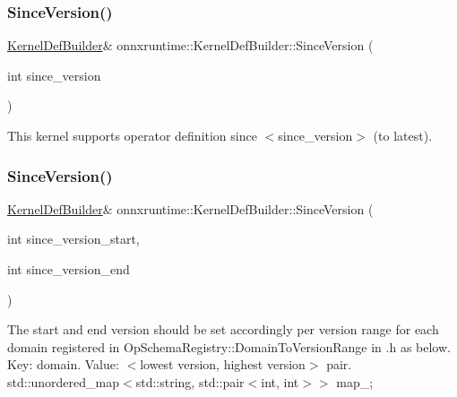 \mbox{\label{classonnxruntime_1_1KernelDefBuilder_ae0ddc824b271a1cb40f689f162049784}} 
\subsubsection{\texorpdfstring{Since\+Version()}{SinceVersion()}\hspace{0.1cm}{\footnotesize\ttfamily [1/2]}}
{\footnotesize\ttfamily \mbox{\hyperlink{classonnxruntime_1_1KernelDefBuilder}{Kernel\+Def\+Builder}}\& onnxruntime\+::\+Kernel\+Def\+Builder\+::\+Since\+Version (\begin{DoxyParamCaption}\item[{int}]{since\+\_\+version }\end{DoxyParamCaption})\hspace{0.3cm}{\ttfamily [inline]}}

This kernel supports operator definition since $<$since\+\_\+version$>$ (to latest). \mbox{\label{classonnxruntime_1_1KernelDefBuilder_a62f33b8471d08dd6d3c8acf086dc33a4}} 
\subsubsection{\texorpdfstring{Since\+Version()}{SinceVersion()}\hspace{0.1cm}{\footnotesize\ttfamily [2/2]}}
{\footnotesize\ttfamily \mbox{\hyperlink{classonnxruntime_1_1KernelDefBuilder}{Kernel\+Def\+Builder}}\& onnxruntime\+::\+Kernel\+Def\+Builder\+::\+Since\+Version (\begin{DoxyParamCaption}\item[{int}]{since\+\_\+version\+\_\+start,  }\item[{int}]{since\+\_\+version\+\_\+end }\end{DoxyParamCaption})\hspace{0.3cm}{\ttfamily [inline]}}

The start and end version should be set accordingly per version range for each domain registered in Op\+Schema\+Registry\+::\+Domain\+To\+Version\+Range in .h as below. Key\+: domain. Value\+: $<$lowest version, highest version$>$ pair. std\+::unordered\+\_\+map$<$std\+::string, std\+::pair$<$int, int$>$$>$ map\+\_\+; \mbox{\label{classonnxruntime_1_1KernelDefBuilder_a254e5b098bd2f9fcac0b81c5b53db954}} 
